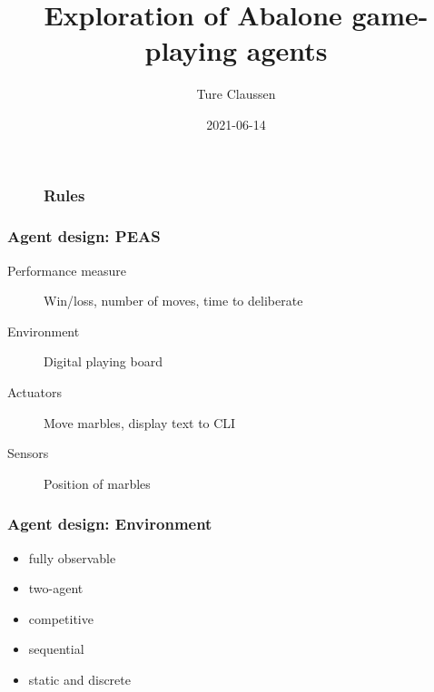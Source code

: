 \documentclass{beamer}
\title{Exploration of Abalone game-playing agents}
\author{Ture Claussen}
\date{2021-06-14}
\begin{document}
\frame{\titlepage}

\begin{frame}
	\begin{figure}
		\frametitle{Rules}
		\centering
		\hfill
		\hfill
	\end{figure}
\end{frame}

\begin{frame}

	\frametitle{Agent design: PEAS}

	\begin{description}
		\item[Performance measure] Win/loss, number of moves, time to deliberate
		\item[Environment] Digital playing board
		\item[Actuators] Move marbles, display text to CLI
		\item[Sensors] Position of marbles
	\end{description}
\end{frame}
\begin{frame}

	\frametitle{Agent design: Environment}

	\begin{itemize}
		\item fully observable
		\item two-agent
		\item competitive
		\item sequential
		\item static and discrete
	\end{itemize}
\end{frame}
\end{document}
